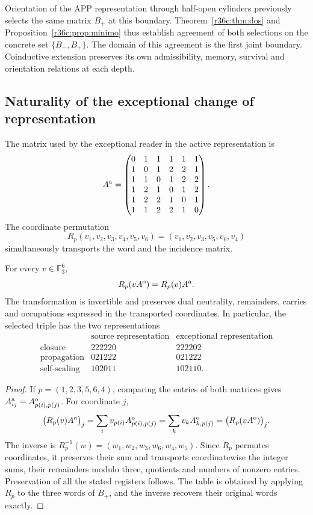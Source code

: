 Orientation of the APP representation through half-open cylinders previously selects the same matrix $B_+$ at this boundary. Theorem~\ref{r36c:thm:dos} and Proposition~\ref{r36c:prop:minimo} thus establish agreement of both selections on the concrete set $\{B_-,B_+\}$. The domain of this agreement is the first joint boundary. Coinductive extension preserves its own admissibility, memory, survival and orientation relations at each depth.

\subsection{Naturality of the exceptional change of representation}

The matrix used by the exceptional reader in the active representation is
\[
A^{\rm a}=\begin{pmatrix}
0&1&1&1&1&1\\1&0&1&2&2&1\\1&1&0&1&2&2\\
1&2&1&0&1&2\\1&2&2&1&0&1\\1&1&2&2&1&0
\end{pmatrix}.
\]
The coordinate permutation
\[
R_p(v_1,v_2,v_3,v_4,v_5,v_6)
=(v_1,v_2,v_3,v_5,v_6,v_4)
\]
simultaneously transports the word and the incidence matrix.

\begin{theorem}
\label{r36c:thm:cambio}
For every $v\in\mathbb F_3^6$,
\[
R_p(vA^{\rm o})=R_p(v)A^{\rm a}.
\]
The transformation is invertible and preserves dual neutrality, remainders, carries and occupations expressed in the transported coordinates. In particular, the selected triple has the two representations
\[
\begin{array}{c|c|c}
&\text{source representation}&\text{exceptional representation}\\\hline
\text{closure}&222220&222202\\
\text{propagation}&021222&021222\\
\text{self-scaling}&102011&102110.
\end{array}
\]
\end{theorem}
\begin{proof}
If $p=(1,2,3,5,6,4)$, comparing the entries of both matrices gives $A^{\rm a}_{ij}=A^{\rm o}_{p(i),p(j)}$. For coordinate $j$,
\[
\bigl(R_p(v)A^{\rm a}\bigr)_j
=\sum_i v_{p(i)}A^{\rm o}_{p(i),p(j)}
=\sum_kv_kA^{\rm o}_{k,p(j)}
=\bigl(R_p(vA^{\rm o})\bigr)_j.
\]
The inverse is $R_p^{-1}(w)=(w_1,w_2,w_3,w_6,w_4,w_5)$. Since $R_p$ permutes coordinates, it preserves their sum and transports coordinatewise the integer sums, their remainders modulo three, quotients and numbers of nonzero entries. Preservation of all the stated registers follows. The table is obtained by applying $R_p$ to the three words of $B_+$, and the inverse recovers their original words exactly.
\end{proof}

